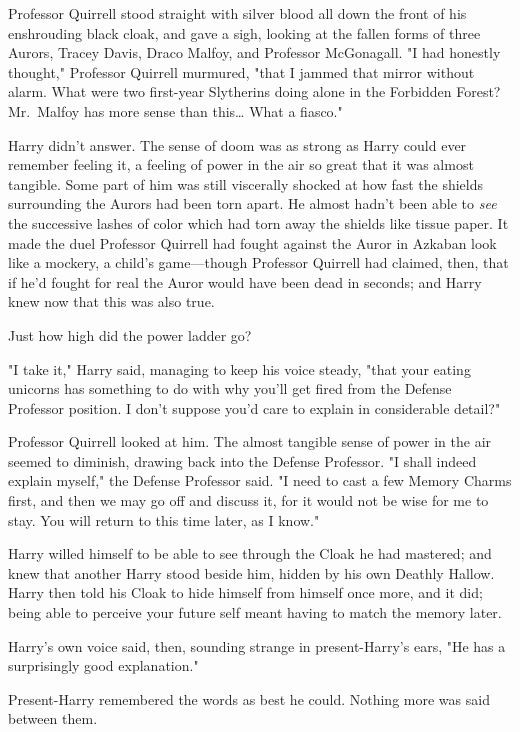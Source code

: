 Professor Quirrell stood straight with silver blood all down the front of his
enshrouding black cloak, and gave a sigh, looking at the fallen forms of three
Aurors, Tracey Davis, Draco Malfoy, and Professor McGonagall. "I had honestly
thought," Professor Quirrell murmured, "that I jammed that mirror without
alarm. What were two first-year Slytherins doing alone in the Forbidden Forest?
Mr.~Malfoy has more sense than this{\ldots} What a fiasco."

Harry didn't answer. The sense of doom was as strong as Harry could ever
remember feeling it, a feeling of power in the air so great that it was almost
tangible. Some part of him was still viscerally shocked at how fast the shields
surrounding the Aurors had been torn apart. He almost hadn't been able to
\emph{see} the successive lashes of color which had torn away the shields like
tissue paper. It made the duel Professor Quirrell had fought against the Auror
in Azkaban look like a mockery, a child's game---though Professor Quirrell had
claimed, then, that if he'd fought for real the Auror would have been dead in
seconds; and Harry knew now that this was also true.

Just how high did the power ladder go?

"I take it," Harry said, managing to keep his voice steady, "that your eating
unicorns has something to do with why you'll get fired from the Defense
Professor position. I don't suppose you'd care to explain in considerable
detail?"

Professor Quirrell looked at him. The almost tangible sense of power in the air
seemed to diminish, drawing back into the Defense Professor. "I shall indeed
explain myself," the Defense Professor said. "I need to cast a few Memory
Charms first, and then we may go off and discuss it, for it would not be wise
for me to stay. You will return to this time later, as I know."

Harry willed himself to be able to see through the Cloak he had mastered; and
knew that another Harry stood beside him, hidden by his own Deathly Hallow.
Harry then told his Cloak to hide himself from himself once more, and it did;
being able to perceive your future self meant having to match the memory later.

Harry's own voice said, then, sounding strange in present-Harry's ears, "He has
a surprisingly good explanation."

Present-Harry remembered the words as best he could. Nothing more was said
between them.

